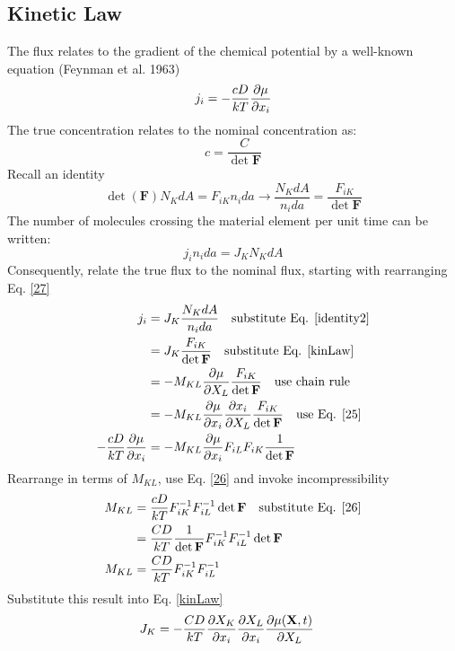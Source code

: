 \documentclass[12pt,3p]{article}
\numberwithin{equation}{section}
\begin{document}
\subsection{Kinetic Law}
The flux relates to the gradient of the chemical potential by a well-known equation (Feynman et al. 1963)
\begin{equation}\label{25}
j_i = - \frac{cD}{kT} \pdv{\mu}{x_i}
\end{equation}
The true concentration relates to the nominal concentration as: 
\begin{equation}\label{26}
c = \frac{C}{\det \mathbf{F}}
\end{equation}
Recall an identity 
\begin{equation}\label{identity2}
\det (\mathbf{F}) N_K dA = F_{iK} n_i da \rightarrow \frac{N_K dA}{n_i da} = \frac{F_{iK}}{\det \mathbf{F}}
\end{equation}
The number of molecules crossing the material element per unit time can be written:
\begin{equation}\label{27}
j_i n_i da = J_K N_K dA
\end{equation}
Consequently, relate the true flux to the nominal flux, starting with rearranging Eq. \ref{27} 
\begin{align*}
\begin{split}
j_i &= J_K \frac{N_K dA}{n_i da} \quad \text{substitute Eq. \ref{identity2}}\\
    &= J_K \frac{F_{iK}}{\det \mathbf{F}} \quad \text{substitute Eq. \ref{kinLaw}} \\
    &= -M_{KL} \pdv{\mu}{X_L} \frac{F_{iK}}{\det \mathbf{F}} \quad \text{use chain rule} \\
    &= - M_{KL} \pdv{\mu}{x_i} \pdv{x_i}{X_L} \frac{F_{iK}}{\det \mathbf{F}} \quad \text{use Eq. \ref{25}} \\
- \frac{cD}{kT} \pdv{\mu}{x_i} &= - M_{KL} \pdv{\mu}{x_i} F_{iL} F_{iK} \frac{1}{\det \mathbf{F}} \\
\end{split} 
\end{align*}
Rearrange in terms of $M_{KL}$, use Eq. \ref{26} and invoke incompressibility
\begin{align}\label{30}
\begin{split}
M_{KL} &= \frac{cD}{kT} F_{iK}^{-1} F_{iL}^{-1} \det \mathbf{F} \quad \text{substitute Eq. \ref{26}} \\
	    &= \frac{CD}{kT} \frac{1}{\det \mathbf{F}} F_{iK}^{-1} F_{iL}^{-1}  \det \mathbf{F} \\
M_{KL} &= \frac{CD}{kT} F_{iK}^{-1} F_{iL}^{-1} 
\end{split} 
\end{align}
Substitute this result into Eq. \ref{kinLaw}
\begin{align}\label{fluxLawFin}
\begin{split}
J_K &= - \frac{CD}{kT} \pdv{X_K}{x_i} \pdv{X_L}{x_i}  \pdv{\mu (\mathbf{X}, t)}{X_L} \end{split}
\end{align}
\end{document}
